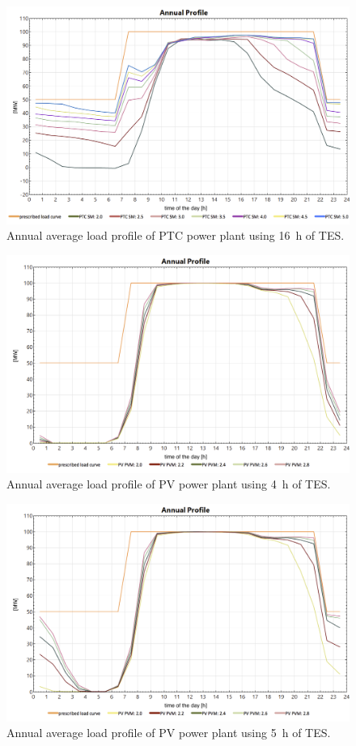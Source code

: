 %
\begin{figure}[htbp]  
\centering
\includegraphics[width=0.8\linewidth]{FIG/Appendix_LCC/PTC16h}
\caption[Annual average load profile of PTC power plant using 16~h of TES.]{Annual average load profile of PTC power plant using 16~h of TES.}\label{PTC16h}
\end{figure}
%
\begin{figure}[htbp]  
\centering
\includegraphics[width=0.8\linewidth]{FIG/Appendix_LCC/PV4h}
\caption[Annual average load profile of PV power plant using 4~h of TES.]{Annual average load profile of PV power plant using 4~h of TES.}\label{PV4h}
\end{figure}
%
\begin{figure}[htbp]  
\centering
\includegraphics[width=0.8\linewidth]{FIG/Appendix_LCC/PV5h}
\caption[Annual average load profile of PV power plant using 5~h of TES.]{Annual average load profile of PV power plant using 5~h of TES.}\label{PV5h}
\end{figure}

